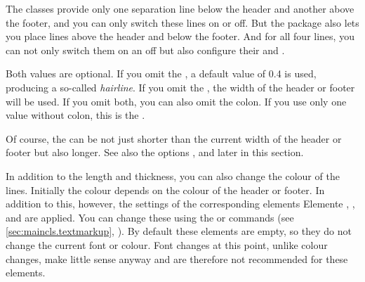 \begin{Declaration}
\end{Declaration}
%
%
%
%
The \KOMAScript{} classes provide only one separation line below the header
and another above the footer, and you can only switch these lines on or off.
But the  package also lets you place lines above the
header and below the footer. And for all four lines, you can not only switch
them on an off but also configure their  and .

Both values are optional. If you omit the , a default value
of 0.4 is used, producing a so-called \emph{hairline}. If you omit
the , the width of the header or footer will be used. If you
omit both, you can also omit the colon. If you use only one value without
colon, this is the .

Of course, the  can be not just shorter than the current width
of the header or footer but also longer. See also the options 
%
,
 and
 later in this section.

\BeginIndexGroup
{}%
%
%
%
In addition to the length and thickness, you can also change the colour of the
lines. Initially the colour depends on the colour of the header or footer. In
addition to this, however, the settings of the corresponding elements
Elemente ,
,  and
 are applied. You can
change these using the  or
 commands (see
\autoref{sec:maincls.textmarkup}, ).
By default these elements are empty, so they do not change the current font or
colour. Font changes at this point, unlike colour changes, make little sense
anyway and are therefore not recommended for these elements.%
\EndIndexGroup
%
\EndIndexGroup


